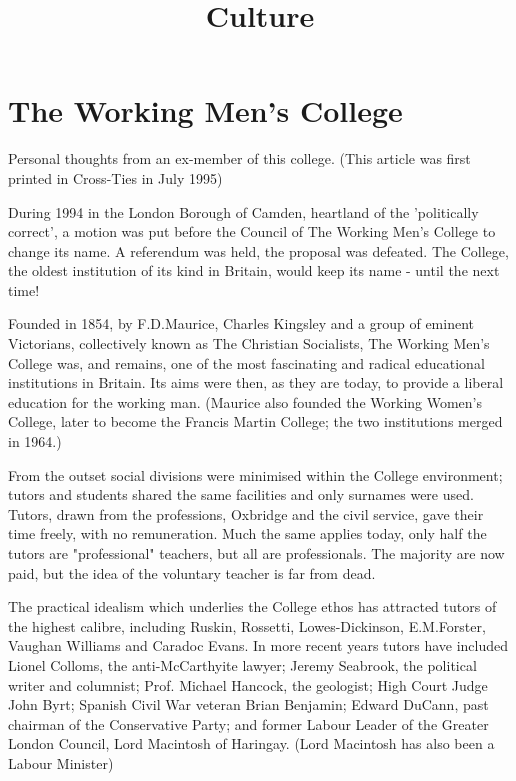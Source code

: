 \documentclass{article}
\title{Culture}
\date{}
\begin{document}
\maketitle
\tableofcontents

\pagebreak
\section{The Working Men's College}

Personal thoughts from an ex-member of this college.
(This article was first printed in Cross-Ties in July 1995)

During 1994 in the London Borough of Camden, heartland of the 'politically correct', a motion was put before the Council of The Working Men's College to change its name.
A referendum was held, the proposal was defeated.
The College, the oldest institution of its kind in Britain, would keep its name - until the next time!

Founded in 1854, by F.D.Maurice, Charles Kingsley and a group of eminent Victorians, collectively known as The Christian Socialists, The Working Men's College was, and remains, one of the most fascinating and radical educational institutions in Britain.
Its aims were then, as they are today, to provide a liberal education for the working man.
(Maurice also founded the Working Women's College, later to become the Francis Martin College; the two institutions merged in 1964.)

From the outset social divisions were minimised within the College environment; tutors and students shared the same facilities and only surnames were used.
Tutors, drawn from the professions, Oxbridge and the civil service, gave their time freely, with no remuneration.
Much the same applies today, only half the tutors are "professional" teachers, but all are professionals.
The majority are now paid, but the idea of the voluntary teacher is far from dead.

The practical idealism which underlies the College ethos has attracted tutors of the highest calibre, including Ruskin, Rossetti, Lowes-Dickinson, E.M.Forster, Vaughan Williams and Caradoc Evans.
In more recent years tutors have included Lionel Colloms, the anti-McCarthyite lawyer; Jeremy Seabrook, the political writer and columnist; Prof. Michael Hancock, the geologist; High Court Judge John Byrt; Spanish Civil War veteran Brian Benjamin; Edward DuCann, past chairman of the Conservative Party; and former Labour Leader of the Greater London Council, Lord Macintosh of Haringay.
(Lord Macintosh has also been a Labour Minister)
\end{document}
